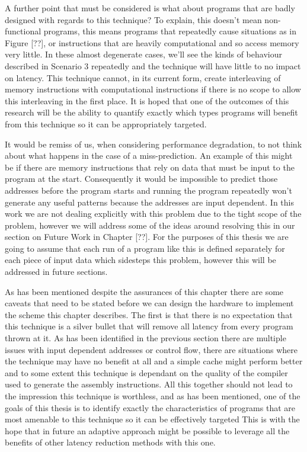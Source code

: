 A further point that must be considered is what about programs that are badly designed with regards to this technique? To explain, this doesn't mean non-functional programs, this means programs that repeatedly cause situations as in Figure [??], or instructions that are heavily computational and so access memory very little. In these almost degenerate cases, we'll see the kinds of behaviour described in Scenario 3 repeatedly and the technique will have little to no impact on latency. This technique cannot, in its current form, create interleaving of memory instructions with computational instructions if there is no scope to allow this interleaving in the first place. It is hoped that one of the outcomes of this research will be the ability to quantify exactly which types programs will benefit from this technique so it can be appropriately targeted. 

It would be remiss of us, when considering performance degradation, to not think about what happens in the case of a miss-prediction. An example of this might be if there are memory instructions that rely on data that must be input to the program at the start. Consequently it would be impossible to predict those addresses before the program starts and running the program repeatedly won't generate any useful patterns because the addresses are input dependent. In this work we are not dealing explicitly with this problem due to the tight scope of the problem, however we will address some of the ideas around resolving this in our section on Future Work in Chapter [??]. For the purposes of this thesis we are going to assume that each run of a program like this is defined separately for each piece of input data which sidesteps this problem, however this will be addressed in future sections.

As has been mentioned despite the assurances of this chapter there are some caveats that need to be stated before we can design the hardware to implement the scheme this chapter describes. The first is that there is no expectation that this technique is a silver bullet that will remove all latency from every program thrown at it. As has been identified in the previous section there are multiple issues with input dependent addresses or control flow, there are situations where the technique may have no benefit at all and a simple cache might perform better and to some extent this technique is dependant on the quality of the compiler used to generate the assembly instructions. All this together should not lead to the impression this technique is worthless, and as has been mentioned, one of the goals of this thesis is to identify exactly the characteristics of programs that are most amenable to this technique so it can be effectively targeted This is with the hope that in future an adaptive approach might be possible to leverage all the benefits of other latency reduction methods with this one.

